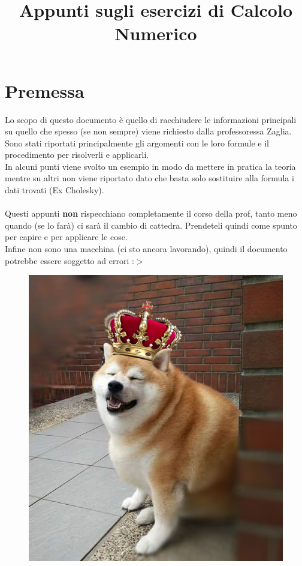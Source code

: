 \documentclass[12pt]{article}
\title{Appunti sugli esercizi di Calcolo Numerico}
\begin{document}
\begin{titlepage}
\maketitle
\end{titlepage}

\section*{Premessa}

\label{Premessa}
Lo scopo di questo documento è quello di racchiudere le informazioni principali su quello che spesso (se non sempre) viene richiesto dalla professoressa Zaglia.
\\
Sono stati riportati principalmente gli argomenti con le loro formule e il procedimento per risolverli e applicarli. \\
In alcuni punti viene svolto un esempio in modo da mettere in pratica la teoria mentre su altri non viene riportato dato che basta solo sostituire alla formula i dati trovati (Ex Cholesky).  
\\ \\  Questi appunti \textbf{non} rispecchiano completamente il corso della prof, tanto meno quando (se lo farà) ci sarà il cambio di cattedra. Prendeteli quindi come spunto per capire e per applicare le cose. 
\\ Infine non sono una macchina (ci sto ancora lavorando), quindi il documento potrebbe essere soggetto ad errori :$>$

\begin{figure}
\centering
  \includegraphics[width=0.5\linewidth]{img/doggo.jpg}
  \label{doggo}
\end{figure}

\newpage

\tableofcontents

\newpage


\newpage

\newpage

\newpage

\newpage

\end{document}
